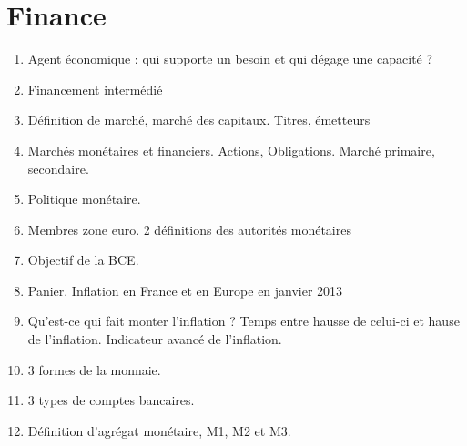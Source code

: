 \documentclass[11pt, twocolumn, landscape]{article}
\begin{document}
\part{Finance}
\begin{enumerate}
\item Agent économique : qui supporte un besoin et qui dégage une capacité ?
\item Financement intermédié
\item Définition de marché, marché des capitaux. Titres, émetteurs
\item Marchés monétaires et financiers. Actions, Obligations. Marché primaire, secondaire.
\item Politique monétaire. 
\item Membres zone euro. 2 définitions des autorités monétaires
\item Objectif de la BCE.
\item Panier. Inflation en France et en Europe en janvier 2013
\item Qu'est-ce qui fait monter l'inflation ? Temps entre hausse de celui-ci et hause de l'inflation. Indicateur avancé de l'inflation.
\item 3 formes de la monnaie. 
\item 3 types de comptes bancaires. 
\item Définition d'agrégat monétaire, M1, M2 et M3. 
\end{enumerate}
\end{document}
